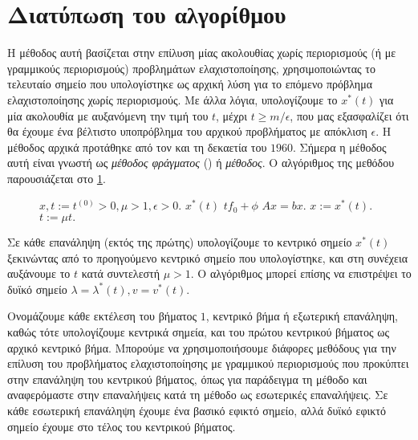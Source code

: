 \section{Διατύπωση του αλγορίθμου }
Η μέθοδος αυτή βασίζεται στην επίλυση μίας ακολουθίας χωρίς περιορισμούς (ή με
γραμμικούς περιορισμούς) προβλημάτων ελαχιστοποίησης, χρησιμοποιώντας το
τελευταίο σημείο που υπολογίστηκε ως αρχική λύση για το επόμενο πρόβλημα
ελαχιστοποίησης χωρίς περιορισμούς. Με άλλα λόγια, υπολογίζουμε το
\( x^*(t) \) για μία ακολουθία με αυξανόμενη την τιμή του \( t \), μέχρι
\(  t \geq m/\epsilon \), που μας εξασφαλίζει ότι θα έχουμε ένα βέλτιστο
υποπρόβλημα του αρχικού προβλήματος με απόκλιση \( \epsilon \).  Η μέθοδος
αρχικά προτάθηκε από τον  και  τη δεκαετία του
\(1960\). Σήμερα η μέθοδος αυτή είναι γνωστή ως \emph{μέθοδος φράγματος}
() ή \emph{ μέθοδος}. Ο αλγόριθμος της
μεθόδου παρουσιάζεται στο \ref{alg:ip_bm}.
\begin{figure}[h]
    \begin{otherlanguage}{english}
        \begin{algorithmic}
            \REQUIRE {}$x,
            t:=t^{(0)}>0,\mu>1,$$\epsilon>0.$
            \REPEAT
            \STATE {}
            \(x^*(t)\)
            \( tf_0 + \phi \)
            \STATE {} \(Ax = b \)\(x.\)
            \STATE {}\(x := x^*(t).\)
            \STATE {}\(t := \mu t.\)
        \end{algorithmic}
    \end{otherlanguage}
    \caption{}
    \label{alg:ip_bm}
\end{figure}

Σε κάθε επανάληψη (εκτός της πρώτης) υπολογίζουμε το κεντρικό σημείο
\( x^*(t) \) ξεκινώντας από το προηγούμενο κεντρικό σημείο που υπολογίστηκε, και
στη συνέχεια αυξάνουμε το \( t \) κατά συντελεστή \( \mu > 1 \). Ο αλγόριθμος
μπορεί επίσης να επιστρέψει το δυϊκό σημείο \( \lambda = \lambda^*(t), v =
v^*(t) \).

Ονομάζουμε κάθε εκτέλεση του βήματος \( 1 \), κεντρικό βήμα ή εξωτερική επανάληψη,
καθώς τότε υπολογίζουμε κεντρικά σημεία, και του πρώτου κεντρικού βήματος ως
αρχικό κεντρικό βήμα.  Μπορούμε να χρησιμοποιήσουμε διάφορες μεθόδους για την
επίλυση του προβλήματος ελαχιστοποίησης με γραμμικού περιορισμούς που προκύπτει
στην επανάληψη του κεντρικού βήματος, όπως για παράδειγμα τη μέθοδο
 και αναφερόμαστε στην επαναλήψεις κατά τη μέθοδο 
ως εσωτερικές επαναλήψεις. Σε κάθε εσωτερική επανάληψη έχουμε ένα βασικό
εφικτό σημείο, αλλά δυϊκό εφικτό σημείο έχουμε στο τέλος του κεντρικού βήματος.

